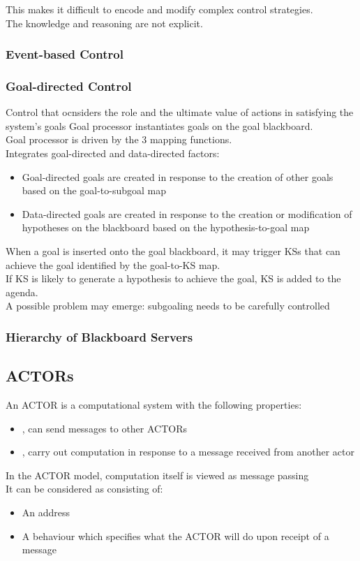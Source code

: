 This makes it difficult to encode and modify complex control strategies.\\
The knowledge and reasoning are not explicit.
\subsubsection{Event-based Control}
\subsubsection{Goal-directed Control}
Control that ocnsiders the role and the ultimate value of actions in satisfying the system's goals
Goal processor instantiates goals on the goal blackboard.\\
Goal processor is driven by the 3 mapping functions.\\
Integrates goal-directed and data-directed factors:
\begin{itemize}
\item Goal-directed goals are created in response to the creation of other goals based on the goal-to-subgoal map
\item Data-directed goals are created in response to the creation or modification of hypotheses on the blackboard based on the hypothesis-to-goal map
\end{itemize}

When a goal is inserted onto the goal blackboard, it may trigger KSs that can achieve the goal identified by the goal-to-KS map.\\
If KS is likely to generate a hypothesis to achieve the goal, KS is added to the agenda.\\
A possible problem may emerge: subgoaling needs to be carefully controlled
\subsubsection{Hierarchy of Blackboard Servers}
\subsection{ACTORs}

An ACTOR is a computational system with the following properties:
\begin{itemize}
\item {}, can send messages to other ACTORs
\item {}, carry out computation in response to a message received from another actor
\end{itemize}
In the ACTOR model, computation itself is viewed as message passing\\
It can be considered as consisting of:
\begin{itemize}
\item An address
\item A behaviour which specifies what the ACTOR will do upon receipt of a message
\end{itemize}

